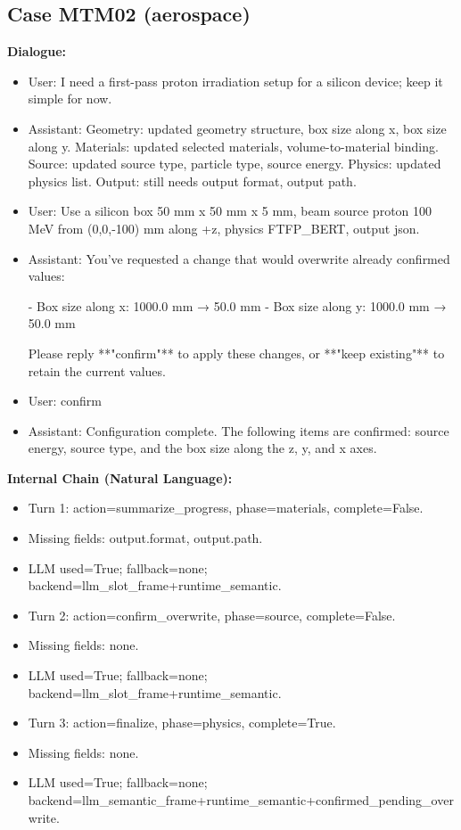 \documentclass[11pt]{ctexart}
\begin{document}
\subsection{Case MTM02 (aerospace)}
\textbf{Dialogue:}
\begin{itemize}
\item User: I need a first-pass proton irradiation setup for a silicon device; keep it simple for now.
\item Assistant: Geometry: updated geometry structure, box size along x, box size along y. Materials: updated selected materials, volume-to-material binding. Source: updated source type, particle type, source energy. Physics: updated physics list. Output: still needs output format, output path.
\item User: Use a silicon box 50 mm x 50 mm x 5 mm, beam source proton 100 MeV from (0,0,-100) mm along +z, physics FTFP\_BERT, output json.
\item Assistant: You've requested a change that would overwrite already confirmed values:

- Box size along x: 1000.0 mm → 50.0 mm
- Box size along y: 1000.0 mm → 50.0 mm

Please reply **"confirm"** to apply these changes, or **"keep existing"** to retain the current values.
\item User: confirm
\item Assistant: Configuration complete. The following items are confirmed: source energy, source type, and the box size along the z, y, and x axes.
\end{itemize}
\textbf{Internal Chain (Natural Language):}
\begin{itemize}
\item Turn 1: action=summarize\_progress, phase=materials, complete=False.
\item Missing fields: output.format, output.path.
\item LLM used=True; fallback=none; backend=llm\_slot\_frame+runtime\_semantic.
\item Turn 2: action=confirm\_overwrite, phase=source, complete=False.
\item Missing fields: none.
\item LLM used=True; fallback=none; backend=llm\_slot\_frame+runtime\_semantic.
\item Turn 3: action=finalize, phase=physics, complete=True.
\item Missing fields: none.
\item LLM used=True; fallback=none; backend=llm\_semantic\_frame+runtime\_semantic+confirmed\_pending\_overwrite.
\end{itemize}
\end{document}
